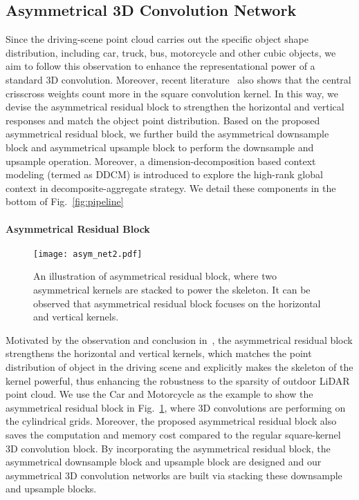 \documentclass[final]{cvpr}
\begin{document}
\subsection{Asymmetrical 3D Convolution Network}

Since the driving-scene point cloud carries out the specific object shape distribution, including car, truck, bus, motorcycle and other cubic objects, we aim to follow this observation to enhance the representational power of a standard 3D convolution. Moreover, recent literature~\cite{wang2019shape,ding2019acnet} also shows that the central crisscross weights count more in the square convolution kernel. In this way, we devise the asymmetrical residual block to strengthen the horizontal and vertical responses and match the object point distribution. 
Based on the proposed asymmetrical residual block, we further build the asymmetrical downsample block and asymmetrical upsample block to perform the downsample and upsample operation. Moreover, a dimension-decomposition based context modeling (termed as DDCM) is introduced to explore the high-rank global context in decomposite-aggregate strategy. We detail these components in the bottom of Fig.~\ref{fig:pipeline}

\paragraph{Asymmetrical Residual Block}

\begin{figure}[t]
    \centering
    \texttt{[image: asym\_net2.pdf]}
    \caption{An illustration of asymmetrical residual block, where two asymmetrical kernels are stacked to power the skeleton. It can be observed that asymmetrical residual block focuses on the horizontal and vertical kernels.}
    \label{fig:asym}
\end{figure}

Motivated by the observation and conclusion in~\cite{wang2019shape,ding2019acnet}, the asymmetrical residual block strengthens the horizontal and vertical kernels, which matches the point distribution of object in the driving scene and explicitly makes the skeleton of the kernel powerful, thus enhancing the robustness to the sparsity of outdoor LiDAR point cloud. We use the Car and Motorcycle as the example to show the asymmetrical residual block in Fig.~\ref{fig:asym}, where 3D convolutions are performing on the cylindrical grids. Moreover, the proposed asymmetrical residual block also saves the computation and memory cost compared to the regular square-kernel 3D convolution block. By incorporating the asymmetrical residual block, the asymmetrical downsample block and upsample block are designed and our asymmetrical 3D convolution networks are built via stacking these downsample and upsample blocks.
    
\end{document}
